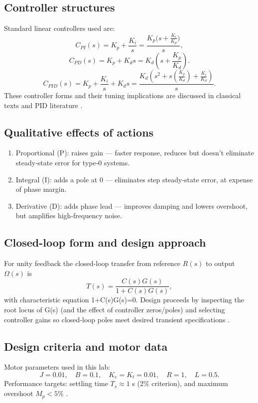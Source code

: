 \documentclass[12pt]{article}
\begin{document}
\subsection*{Controller structures}
Standard linear controllers used are:
\[
  C_{PI}(s)=K_p+\frac{K_i}{s}=\frac{K_p\big(s+\frac{K_i}{K_p}\big)}{s},
\]
\[
  C_{PD}(s)=K_p+K_d s = K_d\left(s+\frac{K_p}{K_d}\right).
\]
\[
  C_{PID}(s)=K_p+\frac{K_i}{s}+K_d s =\frac{K_d\left(s^2 + s\left(\frac{K_p}{K_d}\right) + \frac{K_i}{K_d}\right)}{s}.
\]
These controller forms and their tuning implications are discussed in classical texts and PID literature \cite{Franklin,astrom}.

\subsection*{Qualitative effects of actions}
\begin{enumerate}
  \item Proportional (P): raises gain — faster response, reduces but doesn't eliminate steady‑state error for type‑0 systems.
  \item Integral (I): adds a pole at 0 — eliminates step steady‑state error, at expense of phase margin.
  \item Derivative (D): adds phase lead — improves damping and lowers overshoot, but amplifies high‑frequency noise.
\end{enumerate}

\subsection*{Closed-loop form and design approach}
For unity feedback the closed-loop transfer from reference $R(s)$ to output $\Omega(s)$ is
\[
  T(s)=\frac{C(s)G(s)}{1+C(s)G(s)},
\]
with characteristic equation 1+C(s)G(s)=0. Design proceeds by inspecting the root locus of G(s) (and the effect of controller zeros/poles) and selecting controller gains so closed‑loop poles meet desired transient specifications \cite{Ogata,Franklin}.

\subsection*{Design criteria and motor data}
Motor parameters used in this lab:
\[
  J=0.01,\quad B=0.1,\quad K_e=K_t=0.01,\quad R=1,\quad L=0.5.
\]
Performance targets:
settling time $T_s \approx 1$ s (2\% criterion), and maximum overshoot $M_p < 5\%$ \cite{MATLAB}.
\end{document}
